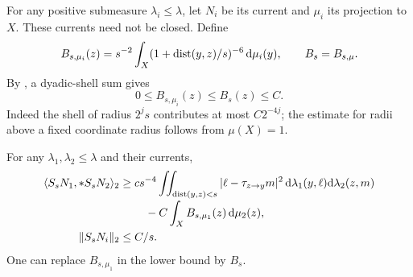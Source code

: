 For any positive submeasure $\lambda_i\le\lambda$, let $N_i$ be its
current and $\mu_i$ its projection to $X$.  These currents need not be
closed.  Define
\begin{equation}\label{eq:current-error-bracket}
 B_{s,\mu_i}(z)=s^{-2}\int_X
       (1+\operatorname{dist}(y,z)/s)^{-6}\,\mathrm d\mu_i(y),
 \qquad B_s=B_{s,\mu}.
\end{equation}
By , a dyadic-shell sum gives
\begin{equation}\label{eq:current-bracket-bound}
 0\le B_{s,\mu_i}(z)\le B_s(z)\le C.
\end{equation}
Indeed the shell of radius $2^js$ contributes at most $C2^{-4j}$;
the estimate for radii above a fixed coordinate radius follows from
$\mu(X)=1$.

\begin{lemma}\label{lem:current-positive-pairing}
For any $\lambda_1,\lambda_2\le\lambda$ and their currents,
\begin{align}
 \langle S_sN_1,*S_sN_2\rangle_2
 &\ge cs^{-4}
       \iint_{\operatorname{dist}(y,z)<s}|\ell-\tau_{z\to y}m|^2
             \,\mathrm d\lambda_1(y,\ell)\mathrm d\lambda_2(z,m)
       \notag\\[-2pt]
 &\hspace{8mm}-C\int_X B_{s,\mu_1}(z)\,\mathrm d\mu_2(z),
                                  \label{eq:current-positive-pairing}\\
 \|S_sN_i\|_2&\le C/s.            \label{eq:current-submeasure-ltwo}
\end{align}
One can replace $B_{s,\mu_1}$ in the lower bound by $B_s$.
\end{lemma}

